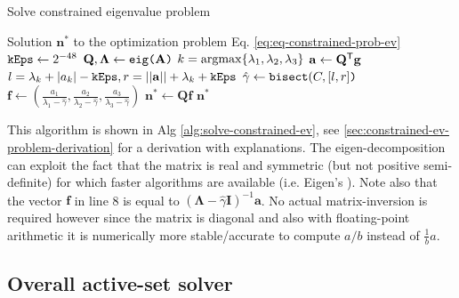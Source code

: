 \begin{algorithm}[!ht]
	\caption{Solve constrained eigenvalue problem}
	\label{alg:solve-constrained-ev}
	\begin{algorithmic}[1]
		\Ensure Solution $\mathbf{n}^*$ to the optimization problem Eq. \ref{eq:eq-constrained-prob-ev}
		\hypertarget{ref:min-constrained-ev}{
			}
		\State $\texttt{kEps} \leftarrow 2^{-48}$ 
		\State $\mathbf{Q}, \mathbf{\Lambda} \leftarrow \texttt{eig(} \mathbf{A} \texttt{)}$ 
		\State $k = \operatorname*{argmax}\{\lambda_1, \lambda_2, \lambda_3\}$
		\State $\mathbf{a} \leftarrow \mathbf{Q}^{\mathsf{T}} \mathbf{g}$
		\State $l = \lambda_k + |a_k| - \texttt{kEps}, r = ||\mathbf{a}|| + \lambda_k + \texttt{kEps}$ 
		\State $\hat{\gamma} \leftarrow \texttt{bisect} (C, [l, r] \texttt{)}$ 
		\State $\mathbf{f} \leftarrow \left(\frac{a_1}{\lambda_1 - \hat{\gamma}}, \frac{a_2}{\lambda_2 - \hat{\gamma}}, \frac{a_3}{\lambda_3 - \hat{\gamma}} \right)$
		\State $\mathbf{n}^* \leftarrow \mathbf{Q}\mathbf{f}$ 
		\State \Return $\mathbf{n}^*$
		\EndFunction
	\end{algorithmic}
\end{algorithm}

This algorithm is shown in Alg \ref{alg:solve-constrained-ev}, see \ref{sec:constrained-ev-problem-derivation} for a derivation with explanations.
The eigen-decomposition can exploit the fact that the matrix is real and symmetric (but not positive semi-definite) for which faster algorithms are available (i.e. Eigen's ). Note also that the vector $\mathbf{f}$ in line 8 is equal to $(\mathbf{\Lambda} - \hat{\gamma} \mathbf{I})^{-1} \mathbf{a}$. No actual matrix-inversion is required however since the matrix is diagonal and also with floating-point arithmetic it is numerically more stable/accurate to compute $a/b$ instead of $\frac{1}{b} a$. 


\subsection{Overall active-set solver}


